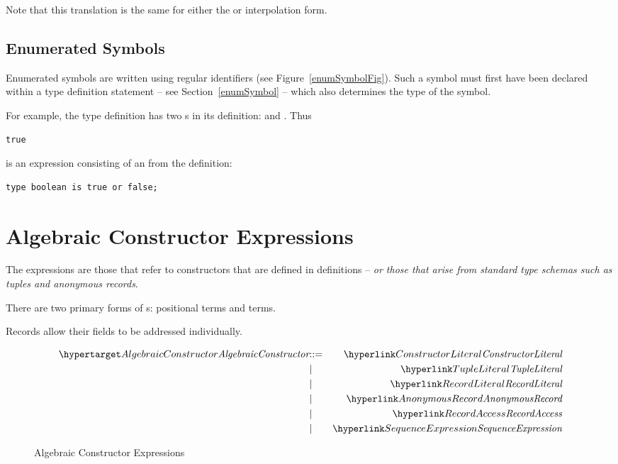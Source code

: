 \begin{aside}
Note that this translation is the same for either the \q{\$} or \q{\#} interpolation form.
\end{aside}


\subsection{Enumerated Symbols}
\label{enumeratedSymbol}
Enumerated symbols are written using regular identifiers (see Figure~\vref{enumSymbolFig}). Such a symbol must first have been declared within a type definition statement -- see Section~\vref{enumSymbol} -- which also determines the type of the symbol.

For example, the  type definition has two s in its definition:  and . Thus
\begin{lstlisting}
true
\end{lstlisting}
is an expression consisting of an  from the definition:
\begin{lstlisting}
type boolean is true or false;
\end{lstlisting}

\section{Algebraic Constructor Expressions}
\label{algebraicConstructors}

The  expressions are those that refer to constructors that are defined in  definitions -- \emph{or those that arise from standard type schemas such as tuples and anonymous records}.

There are two primary forms of s: positional  terms and  terms.

Records allow their fields to be addressed individually.

\begin{figure}[htbp]
\begin{eqnarray*}
\ntDef{AlgebraicConstructor}&\arrow&\ntRef{ConstructorLiteral}\\
&\choice&\ntRef{TupleLiteral}\\
&\choice&\ntRef{RecordLiteral}\\
&\choice&\ntRef{AnonymousRecord}\\
&\choice&\ntRef{RecordAccess}\\
&\choice&\ntRef{SequenceExpression}
\end{eqnarray*}
\caption{Algebraic Constructor Expressions}
\label{algebraicExpressionFig}
\end{figure}

